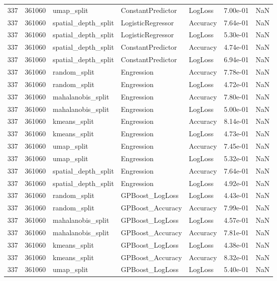 \begin{tabular}{rrlllrr}
337 & 361060 & umap\_split & ConstantPredictor & LogLoss & 7.00e-01 & NaN \\
337 & 361060 & spatial\_depth\_split & LogisticRegressor & Accuracy & 7.64e-01 & NaN \\
337 & 361060 & spatial\_depth\_split & LogisticRegressor & LogLoss & 5.30e-01 & NaN \\
337 & 361060 & spatial\_depth\_split & ConstantPredictor & Accuracy & 4.74e-01 & NaN \\
337 & 361060 & spatial\_depth\_split & ConstantPredictor & LogLoss & 6.94e-01 & NaN \\
337 & 361060 & random\_split & Engression & Accuracy & 7.78e-01 & NaN \\
337 & 361060 & random\_split & Engression & LogLoss & 4.72e-01 & NaN \\
337 & 361060 & mahalanobis\_split & Engression & Accuracy & 7.80e-01 & NaN \\
337 & 361060 & mahalanobis\_split & Engression & LogLoss & 5.00e-01 & NaN \\
337 & 361060 & kmeans\_split & Engression & Accuracy & 8.14e-01 & NaN \\
337 & 361060 & kmeans\_split & Engression & LogLoss & 4.73e-01 & NaN \\
337 & 361060 & umap\_split & Engression & Accuracy & 7.45e-01 & NaN \\
337 & 361060 & umap\_split & Engression & LogLoss & 5.32e-01 & NaN \\
337 & 361060 & spatial\_depth\_split & Engression & Accuracy & 7.64e-01 & NaN \\
337 & 361060 & spatial\_depth\_split & Engression & LogLoss & 4.92e-01 & NaN \\
337 & 361060 & random\_split & GPBoost\_LogLoss & LogLoss & 4.43e-01 & NaN \\
337 & 361060 & random\_split & GPBoost\_Accuracy & Accuracy & 7.99e-01 & NaN \\
337 & 361060 & mahalanobis\_split & GPBoost\_LogLoss & LogLoss & 4.57e-01 & NaN \\
337 & 361060 & mahalanobis\_split & GPBoost\_Accuracy & Accuracy & 7.81e-01 & NaN \\
337 & 361060 & kmeans\_split & GPBoost\_LogLoss & LogLoss & 4.38e-01 & NaN \\
337 & 361060 & kmeans\_split & GPBoost\_Accuracy & Accuracy & 8.32e-01 & NaN \\
337 & 361060 & umap\_split & GPBoost\_LogLoss & LogLoss & 5.40e-01 & NaN \\

\end{tabular}
